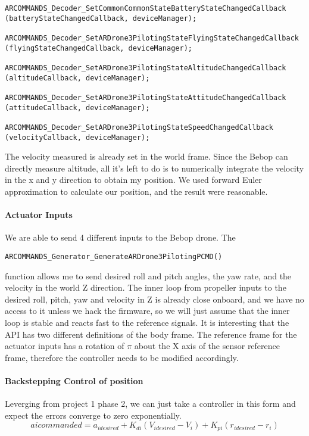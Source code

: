 \documentclass[english, twocolumn]{article}
\begin{document}
 \begin{adjustbox}{width=.45*\textwidth, height=4*\textheight,keepaspectratio}
\begin{lstlisting}
ARCOMMANDS_Decoder_SetCommonCommonStateBatteryStateChangedCallback
(batteryStateChangedCallback, deviceManager);

ARCOMMANDS_Decoder_SetARDrone3PilotingStateFlyingStateChangedCallback
(flyingStateChangedCallback, deviceManager);

ARCOMMANDS_Decoder_SetARDrone3PilotingStateAltitudeChangedCallback
(altitudeCallback, deviceManager);

ARCOMMANDS_Decoder_SetARDrone3PilotingStateAttitudeChangedCallback
(attitudeCallback, deviceManager);

ARCOMMANDS_Decoder_SetARDrone3PilotingStateSpeedChangedCallback
(velocityCallback, deviceManager);
\end{lstlisting}
\end{adjustbox}
The velocity measured is already set in the world frame. Since the Bebop can directly measure altitude, all it's left to do is to numerically integrate the velocity in the x and y direction to obtain my position. We used forward Euler approximation to calculate our position, and the result were reasonable. \\

\paragraph{Actuator Inputs}
We are able to send 4 different inputs to the Bebop drone. The
\begin{verbatim}
ARCOMMANDS_Generator_GenerateARDrone3PilotingPCMD()
\end{verbatim} function 
allows me to send desired roll and pitch angles, the yaw rate, and the velocity
in the world Z direction. The inner loop from propeller inputs to the desired
roll, pitch, yaw and velocity in Z is already close onboard, and we have no 
access to it unless we hack the firmware, so we will just assume that the inner
loop is stable and reacts fast to the reference signals. It is interesting that the
API has two different definitions of the body frame. The reference frame for
the actuator inputs has a rotation of $\pi$ about the X axis of the sensor
reference frame, therefore the controller needs to be modified accordingly.\\

\paragraph{Backstepping Control of position}
Leverging from project 1 phase 2, we can just take a controller in this form and expect the errors converge to zero exponentially.
$$a{i commanded} = a_{i desired} + K_{di}(V_{i desired} - V_i) + K_{p i}(r_{i desired} - r_i)$$
\end{document}

